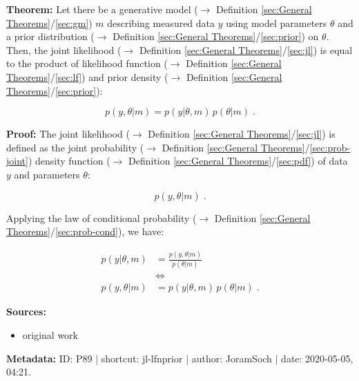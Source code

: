 \documentclass[a4paper,12pt,twoside]{book}
\begin{document}
\textbf{Theorem:} Let there be a generative model ($\rightarrow$ Definition \ref{sec:General Theorems}/\ref{sec:gm}) $m$ describing measured data $y$ using model parameters $\theta$ and a prior distribution ($\rightarrow$ Definition \ref{sec:General Theorems}/\ref{sec:prior}) on $\theta$. Then, the joint likelihood ($\rightarrow$ Definition \ref{sec:General Theorems}/\ref{sec:jl}) is equal to the product of likelihood function ($\rightarrow$ Definition \ref{sec:General Theorems}/\ref{sec:lf}) and prior density ($\rightarrow$ Definition \ref{sec:General Theorems}/\ref{sec:prior}):

\begin{equation} \label{eq:jl-lfnprior-jl}
p(y,\theta|m) = p(y|\theta,m) \, p(\theta|m) \; .
\end{equation}


\vspace{1em}
\textbf{Proof:} The joint likelihood ($\rightarrow$ Definition \ref{sec:General Theorems}/\ref{sec:jl}) is defined as the joint probability ($\rightarrow$ Definition \ref{sec:General Theorems}/\ref{sec:prob-joint}) density function ($\rightarrow$ Definition \ref{sec:General Theorems}/\ref{sec:pdf}) of data $y$ and parameters $\theta$:

\begin{equation} \label{eq:jl-lfnprior-jl-def}
p(y,\theta|m) \; .
\end{equation}

Applying the law of conditional probability ($\rightarrow$ Definition \ref{sec:General Theorems}/\ref{sec:prob-cond}), we have:

\begin{equation} \label{eq:jl-lfnprior-jl-qed}
\begin{split}
p(y|\theta,m) &= \frac{p(y,\theta|m)}{p(\theta|m)} \\
&\Leftrightarrow \\
p(y,\theta|m) &= p(y|\theta,m) \, p(\theta|m) \; .
\end{split}
\end{equation}


\vspace{1em}
\textbf{Sources:}
\begin{itemize}
\item original work\end{itemize}


\vspace{1em}
\textbf{Metadata:} ID: P89 | shortcut: jl-lfnprior | author: JoramSoch | date: 2020-05-05, 04:21.
\vspace{1em}
\end{document}
